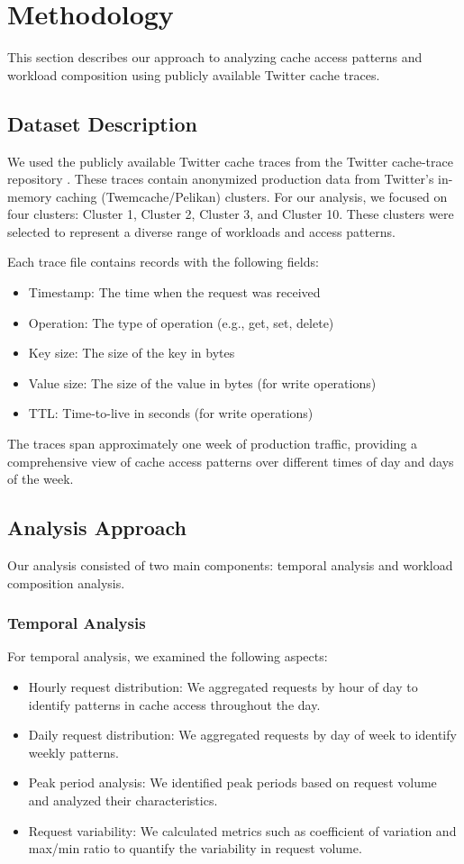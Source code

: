 \documentclass[conference]{IEEEtran}
\begin{document}
\section{Methodology}
This section describes our approach to analyzing cache access patterns and workload composition using publicly available Twitter cache traces.

\subsection{Dataset Description}
We used the publicly available Twitter cache traces from the Twitter cache-trace repository \cite{twitter_cache_trace}. These traces contain anonymized production data from Twitter's in-memory caching (Twemcache/Pelikan) clusters. For our analysis, we focused on four clusters: Cluster 1, Cluster 2, Cluster 3, and Cluster 10. These clusters were selected to represent a diverse range of workloads and access patterns.

Each trace file contains records with the following fields:
\begin{itemize}
    \item Timestamp: The time when the request was received
    \item Operation: The type of operation (e.g., get, set, delete)
    \item Key size: The size of the key in bytes
    \item Value size: The size of the value in bytes (for write operations)
    \item TTL: Time-to-live in seconds (for write operations)
\end{itemize}

The traces span approximately one week of production traffic, providing a comprehensive view of cache access patterns over different times of day and days of the week.

\subsection{Analysis Approach}
Our analysis consisted of two main components: temporal analysis and workload composition analysis.

\subsubsection{Temporal Analysis}
For temporal analysis, we examined the following aspects:
\begin{itemize}
    \item Hourly request distribution: We aggregated requests by hour of day to identify patterns in cache access throughout the day.
    \item Daily request distribution: We aggregated requests by day of week to identify weekly patterns.
    \item Peak period analysis: We identified peak periods based on request volume and analyzed their characteristics.
    \item Request variability: We calculated metrics such as coefficient of variation and max/min ratio to quantify the variability in request volume.
\end{itemize}
\end{document}
